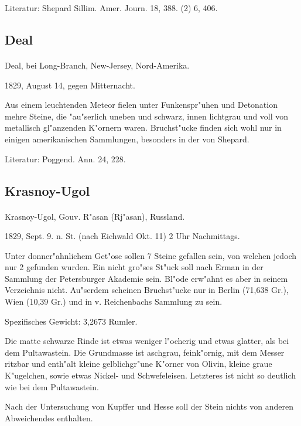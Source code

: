 \documentclass[a4paper, 11pt, oneside]{article}
\begin{document}
\footnotesize
Literatur: Shepard Sillim. Amer. Journ. 18, 388. (2) 6, 406.

\subsection{Deal}
\normalsize
\paragraph{}
Deal, bei Long-Branch, New-Jersey, Nord-Amerika.

1829, August 14, gegen Mitternacht.

Aus einem leuchtenden Meteor fielen unter Funkenspr"uhen und Detonation mehre Steine, die "au"serlich uneben und schwarz, innen lichtgrau und voll von metallisch gl"anzenden K"ornern waren. Bruchst"ucke finden sich wohl nur in einigen amerikanischen Sammlungen, besonders in der von Shepard.

Literatur: Poggend. Ann. 24, 228.

\subsection{Krasnoy-Ugol}
\normalsize
\paragraph{}
Krasnoy-Ugol, Gouv. R"asan (Rj"asan), Russland.

1829, Sept. 9. n. St. (nach Eichwald Okt. 11) 2 Uhr Nachmittags.

Unter donner"ahnlichem Get"ose sollen 7 Steine gefallen sein, von welchen jedoch nur 2 gefunden wurden. Ein nicht gro"ses St"uck soll nach Erman in der Sammlung der Petersburger Akademie sein. Bl"ode erw"ahnt es aber in seinem Verzeichnis nicht. Au"serdem scheinen Bruchst"ucke nur in Berlin (71,638 Gr.), Wien (10,39 Gr.) und in v. Reichenbachs Sammlung zu sein.

Spezifisches Gewicht: 3,2673 Rumler.

Die matte schwarze Rinde ist etwas weniger l"ocherig und etwas glatter, als bei dem Pultawastein. Die Grundmasse ist aschgrau, feink"ornig, mit dem Messer ritzbar und enth"alt kleine gelblichgr"une K"orner von Olivin, kleine graue K"ugelchen, sowie etwas Nickel- und Schwefeleisen. Letzteres ist nicht so deutlich wie bei dem Pultawastein.

Nach der Untersuchung von Kupffer und Hesse soll der Stein nichts von anderen Abweichendes enthalten.
\end{document}
